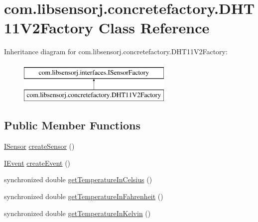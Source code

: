 \hypertarget{classcom_1_1libsensorj_1_1concretefactory_1_1DHT11V2Factory}{}\section{com.\+libsensorj.\+concretefactory.\+D\+H\+T11\+V2\+Factory Class Reference}
\label{classcom_1_1libsensorj_1_1concretefactory_1_1DHT11V2Factory}
Inheritance diagram for com.\+libsensorj.\+concretefactory.\+D\+H\+T11\+V2\+Factory\+:\begin{figure}[H]
\begin{center}
\leavevmode
\includegraphics[height=2.000000cm]{classcom_1_1libsensorj_1_1concretefactory_1_1DHT11V2Factory}
\end{center}
\end{figure}
\subsection*{Public Member Functions}
\begin{DoxyCompactItemize}
\item 
\hyperlink{interfacecom_1_1libsensorj_1_1interfaces_1_1ISensor}{I\+Sensor} \hyperlink{classcom_1_1libsensorj_1_1concretefactory_1_1DHT11V2Factory_ac04eaebc748d420eb035439dfc1d2202}{create\+Sensor} ()
\item 
\hyperlink{classcom_1_1libsensorj_1_1interfaces_1_1IEvent}{I\+Event} \hyperlink{classcom_1_1libsensorj_1_1concretefactory_1_1DHT11V2Factory_a0eb0b480f4133c3eeb2728bd0fa45c58}{create\+Event} ()
\item 
synchronized double \hyperlink{classcom_1_1libsensorj_1_1concretefactory_1_1DHT11V2Factory_a2c966faecd375072c885ca7dadb76530}{get\+Temperature\+In\+Celsius} ()
\item 
synchronized double \hyperlink{classcom_1_1libsensorj_1_1concretefactory_1_1DHT11V2Factory_a1716289d2f7d918b7daa8b61fece0712}{get\+Temperature\+In\+Fahrenheit} ()
\item 
synchronized double \hyperlink{classcom_1_1libsensorj_1_1concretefactory_1_1DHT11V2Factory_a9524a22ee17f7382aa40bd9350ddc21f}{get\+Temperature\+In\+Kelvin} ()
\end{DoxyCompactItemize}
